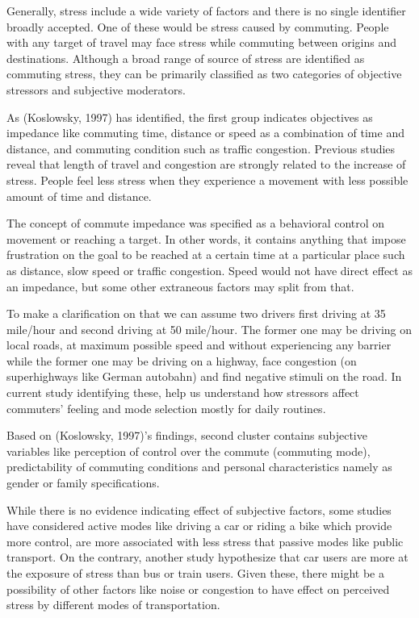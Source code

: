 \documentclass[
11pt, %
oneside, %
english, %
singlespacing, %
]{macthesis} %
\begin{document}
Generally, stress include a wide variety of factors and there is no single identifier broadly accepted. One of these would be stress caused by commuting. People with any target of travel may face stress while commuting between origins and destinations. Although a broad range of source of stress are identified as commuting stress, they can be primarily classified as two categories of objective stressors and subjective moderators.

As (Koslowsky, 1997) has identified, the first group indicates objectives as impedance like commuting time, distance or speed as a combination of time and distance, and commuting condition such as traffic congestion. Previous studies reveal that length of travel and congestion are strongly related to the increase of stress. People feel less stress when they experience a movement with less possible amount of time and distance.

The concept of commute impedance was specified as a behavioral control on movement or reaching a target. In other words, it contains anything that impose frustration on the goal to be reached at a certain time at a particular place such as distance, slow speed or traffic congestion. Speed would not have direct effect as an impedance, but some other extraneous factors may split from that.

To make a clarification on that we can assume two drivers first driving at 35 mile/hour and second driving at 50 mile/hour. The former one may be driving on local roads, at maximum possible speed and without experiencing any barrier while the former one may be driving on a highway, face congestion (on superhighways like German autobahn) and find negative stimuli on the road. In current study identifying these, help us understand how stressors affect commuters' feeling and mode selection mostly for daily routines.

Based on (Koslowsky, 1997)'s findings, second cluster contains subjective variables like perception of control over the commute (commuting mode), predictability of commuting conditions and personal characteristics namely as gender or family specifications.

While there is no evidence indicating effect of subjective factors, some studies have considered active modes like driving a car or riding a bike which provide more control, are more associated with less stress that passive modes like public transport. On the contrary, another study hypothesize that car users are more at the exposure of stress than bus or train users. Given these, there might be a possibility of other factors like noise or congestion to have effect on perceived stress by different modes of transportation.
\end{document}

